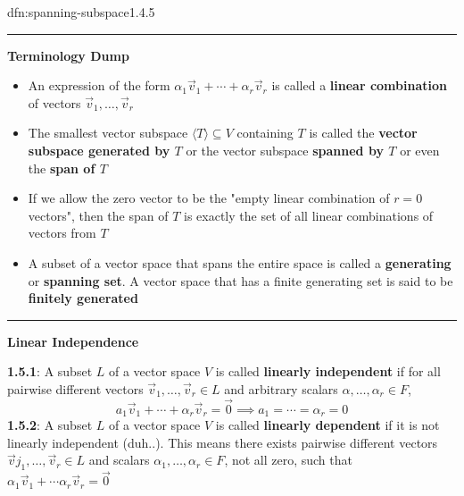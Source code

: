 \documentclass[landscape, 8pt]{extarticle}
\begin{document}
\begin{multicols}{3}
\begin{dfn}{dfn:spanning-subspace}{1.4.5}

    \noindent\rule{\textwidth}{0.2pt}

    \textbf{Terminology Dump}
    \begin{itemize}
        \setlength\itemsep{0em}
        \item An expression of the form $\alpha_{1}\vec{v}_{1}+\cdots+\alpha_{r}\vec{v}_{r}$ is called a \newline\textbf{linear combination} of vectors $\vec{v}_{1},\dots,\vec{v}_{r}$
        \item The smallest vector subspace $\langle T \rangle \subseteq V$ containing $T$ is called the \textbf{vector subspace generated by $T$} or the vector subspace \textbf{spanned by $T$} or even the \textbf{span of $T$}
        \item If we allow the zero vector to be the "empty linear combination of $r = 0$ vectors", then the span of $T$ is exactly the set of all linear combinations of vectors from $T$ 
        \item[\textbf{1.4.7}:] A subset of a vector space that spans the entire space is called a \textbf{generating} or \textbf{spanning set}. A vector space that has a finite generating set is said to be \textbf{finitely generated}
    \end{itemize}

    \vspace{-5pt}
    \noindent\rule{\textwidth}{0.2pt}

    \textbf{Linear Independence}
    \vspace{5pt}

    \textbf{1.5.1}: A subset $L$ of a vector space $V$ is called \textbf{linearly \newline independent} if for all pairwise different vectors $\vec{v}_{1},\dots,\vec{v}_{r}\in L$ and arbitrary scalars $\alpha,\dots,\alpha_{r}\in F$,
    \[a_{1}\vec{v}_{1} + \cdots + \alpha_{r}\vec{v}_{r} = \vec{0} \implies a_{1} = \cdots = \alpha_{r} = 0\]
    \textbf{1.5.2}: A subset $L$ of a vector space $V$ is called \textbf{linearly \newline dependent} if it is not linearly independent (duh..). This means there exists pairwise different vectors $\vec{v}j_{1},\dots,\vec{v}_{r}\in L$ and scalars $\alpha_{1},\dots,\alpha_{r}\in F$, not all zero, such that $\alpha_{1}\vec{v}_{1} + \cdots \alpha_{r}\vec{v}_{r} = \vec{0}$
\end{dfn}



\end{multicols}
\end{document}
